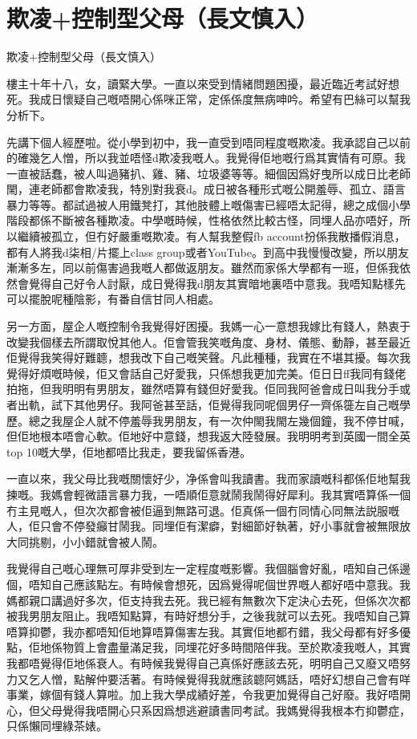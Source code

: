 \chapter{欺凌+控制型父母（長文慎入）}

欺凌+控制型父母（長文慎入）

樓主十年十八，女，讀緊大學。一直以來受到情緒問題困擾，最近臨近考試好想死。我成日懷疑自己嘅唔開心係咪正常，定係係度無病呻吟。希望有巴絲可以幫我分析下。

先講下個人經歷啦。從小學到初中，我一直受到唔同程度嘅欺凌。我承認自己以前的確幾乞人憎，所以我並唔怪d欺凌我嘅人。我覺得佢地嘅行爲其實情有可原。我一直被話蠢，被人叫過豬扒、雞、豬、垃圾婆等等。細個因爲好曳所以成日比老師閙，連老師都會欺凌我，特別對我衰d。成日被各種形式嘅公開羞辱、孤立、語言暴力等等。都試過被人用鐵凳打，其他肢體上嘅傷害已經唔太記得，總之成個小學階段都係不斷被各種欺凌。中學嘅時候，性格依然比較古怪，同埋人品亦唔好，所以繼續被孤立，但冇好嚴重嘅欺凌。有人幫我整假fb account扮係我散播假消息，都有人將我d柒相/片擺上class group或者YouTube。到高中我慢慢改變，所以朋友漸漸多左，同以前傷害過我嘅人都做返朋友。雖然而家係大學都有一班，但係我依然會覺得自己好令人討厭，成日覺得我d朋友其實暗地裏唔中意我。我唔知點樣先可以擺脫呢種陰影，有番自信甘同人相處。

另一方面，屋企人嘅控制令我覺得好困擾。我媽一心一意想我嫁比有錢人，熱衷于改變我個樣去所謂取悅其他人。佢會管我笑嘅角度、身材、儀態、動靜，甚至最近佢覺得我笑得好難聼，想我改下自己嘅笑聲。凡此種種，我實在不堪其擾。每次我覺得好煩嘅時候，佢又會話自己好愛我，只係想我更加完美。佢日日ff我同有錢佬拍拖，但我明明有男朋友，雖然唔算有錢但好愛我。佢同我阿爸會成日叫我分手或者出軌，試下其他男仔。我阿爸甚至話，佢覺得我同呢個男仔一齊係簁左自己嘅學歷。總之我屋企人就不停羞辱我男朋友，有一次仲閙我閙左幾個鐘，我不停甘喊，但佢地根本唔會心軟。佢地好中意錢，想我返大陸發展。我明明考到英國一間全英top 10嘅大學，佢地都唔比我走，要我留係香港。

一直以來，我父母比我嘅關懷好少，净係會叫我讀書。我而家讀嘅科都係佢地幫我揀嘅。我媽會輕微語言暴力我，一唔順佢意就鬧我鬧得好犀利。我其實唔算係一個冇主見嘅人，但次次都會被佢逼到無路可退。佢真係一個冇同情心同無法説服嘅人，佢只會不停發癲甘鬧我。同埋佢有潔癖，對細節好執著，好小事就會被無限放大同挑剔，小小錯就會被人鬧。

我覺得自己嘅心理無可厚非受到左一定程度嘅影響。我個腦會好亂，唔知自己係邊個，唔知自己應該點左。有時候會想死，因爲覺得呢個世界嘅人都好唔中意我。我媽都親口講過好多次，佢支持我去死。我已經有無數次下定決心去死，但係次次都被我男朋友阻止。我唔知點算，有時好想分手，之後我就可以去死。我唔知自己算唔算抑鬱，我亦都唔知佢地算唔算傷害左我。其實佢地都冇錯，我父母都有好多優點，佢地係物質上會盡量滿足我，同埋花好多時間陪伴我。至於欺凌我嘅人，其實我都唔覺得佢地係衰人。有時候我覺得自己真係好應該去死，明明自己又廢又唔努力又乞人憎，點解仲要活著。有時候覺得我就應該聼阿媽話，唔好幻想自己會有咩事業，嫁個有錢人算啦。加上我大學成績好差，令我更加覺得自己好廢。我好唔開心，但父母覺得我唔開心只系因爲想逃避讀書同考試。我媽覺得我根本冇抑鬱症，只係懶同埋綠茶婊。

